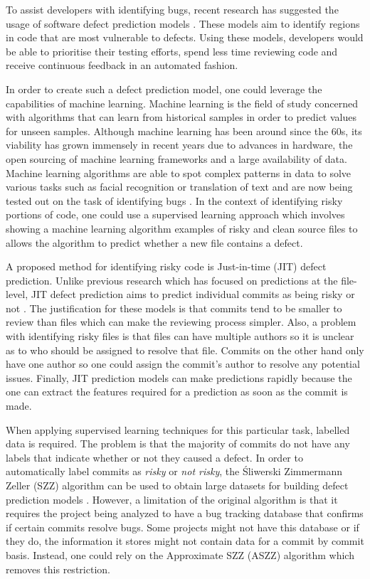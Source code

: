 \documentclass[../main.tex]{subfiles}
\begin{document}
To assist developers with identifying bugs, recent research has suggested the usage of software defect prediction models \cite{kamei2013large}. These models aim to identify regions in code that are most vulnerable to defects. Using these models, developers would be able to prioritise their testing efforts, spend less time reviewing code and receive continuous feedback in an automated fashion. 

In order to create such a defect prediction model, one could leverage the capabilities of machine learning. Machine learning is the field of study concerned with algorithms that can learn from historical samples in order to predict values for unseen samples. Although machine learning has been around since the 60s, its viability has grown immensely in recent years due to advances in hardware, the open sourcing of machine learning frameworks and a large availability of data. Machine learning algorithms are able to spot complex patterns in data to solve various tasks such as facial recognition or translation of text and are now being tested out on the task of identifying bugs \cite{nayrolles2018clever}. In the context of identifying risky portions of code, one could use a supervised learning approach which involves showing a machine learning algorithm examples of risky and clean source files to allows the algorithm to predict whether a new file contains a defect. 

A proposed method for identifying risky code is Just-in-time (JIT) defect prediction. Unlike previous research which has focused on predictions at the file-level, JIT defect prediction aims to predict individual commits as being risky or not \cite{kamei2013large}. The justification for these models is that commits tend to be smaller to review than files which can make the reviewing process simpler. Also, a problem with identifying risky files is that files can have multiple authors so it is unclear as to who should be assigned to resolve that file. Commits on the other hand only have one author so one could assign the commit's author to resolve any potential issues. Finally, JIT prediction models can make predictions rapidly because the one can extract the features required for a prediction as soon as the commit is made. 

When applying supervised learning techniques for this particular task, labelled data is required. The problem is that the majority of commits do not have any labels that indicate whether or not they caused a defect. In order to automatically label commits as \textit{risky} or \textit{not risky}, the Śliwerski Zimmermann Zeller (SZZ) algorithm can be used to obtain large datasets for building defect prediction models \cite{sliwerski2005changes}. However, a limitation of the original algorithm is that it requires the project being analyzed to have a bug tracking database that confirms if certain commits resolve bugs. Some projects might not have this database or if they do, the information it stores might not contain data for a commit by commit basis. Instead, one could rely on the Approximate SZZ (ASZZ) algorithm which removes this restriction. 
\end{document}
